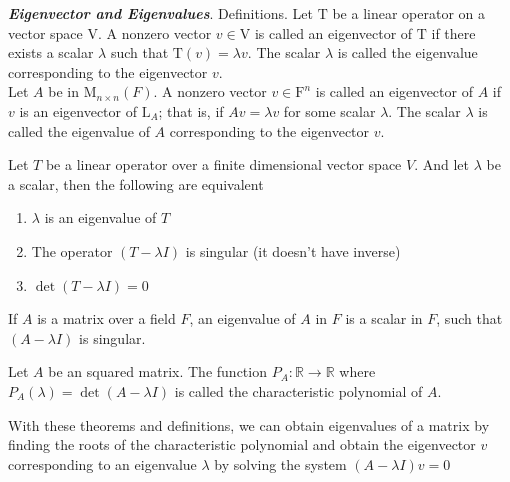 \documentclass{report}
\begin{document}
    \begin{defBox}
        \textit{\textbf{Eigenvector and Eigenvalues}}. Definitions. Let $\mathrm{T}$ be a linear operator on a vector space V. A nonzero vector $v \in \mathrm{V}$ is called an eigenvector of $\mathrm{T}$ if there exists a scalar $\lambda$ such that $\mathrm{T}(v)=\lambda v$. The scalar $\lambda$ is called the eigenvalue corresponding to the eigenvector $v$.\\

        Let $A$ be in $\mathrm{M}_{n \times n}(F)$. A nonzero vector $v \in \mathrm{F}^n$ is called an eigenvector of $A$ if $v$ is an eigenvector of $\mathrm{L}_A$; that is, if $A v=\lambda v$ for some scalar $\lambda$. The scalar $\lambda$ is called the eigenvalue of $A$ corresponding to the eigenvector $v$.
    \end{defBox}

    \begin{thBox}
        Let $T$ be a linear operator over a finite dimensional vector space $V$. And let $\lambda$ be a scalar, then the following are equivalent

        \begin{enumerate}
            \item $\lambda$ is an eigenvalue of $T$
            \item The operator $(T - \lambda I)$ is singular (it doesn't have inverse)
            \item $\det(T-\lambda I) = 0$
        \end{enumerate}
    \end{thBox}

    \begin{defBox}
        If $A$ is a matrix over a field $F$, an eigenvalue of $A$ in $F$ is a scalar in $F$, such that $(A - \lambda I)$ is singular.
    \end{defBox}

    \begin{defBox}
        Let $A$ be an squared matrix. The function $P_A: \mathbb{R} \to \mathbb{R}$ where $P_A(\lambda) = \det(A - \lambda I)$ is called the characteristic polynomial of $A$.
    \end{defBox}

    With these theorems and definitions, we can obtain eigenvalues of a matrix by finding the roots of the characteristic polynomial and obtain the eigenvector $v$ corresponding to an eigenvalue $\lambda$ by solving the system $(A-\lambda I)v = 0$
\end{document}
